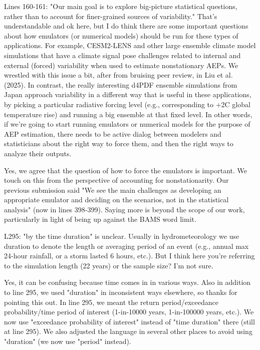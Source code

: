 \documentclass[12pt,english]{reviewresponse}
\begin{document}
\begin{revcomment}
   Lines 160-161: "Our main goal is to explore big-picture statistical questions, rather than to account for finer-grained sources of variability." That's understandable and ok here, but I do think there are some important questions about how emulators (or numerical models) should be run for these types of applications. For example, CESM2-LENS and other large ensemble climate model simulations that have a climate signal pose challenges related to internal and external (forced) variability when used to estimate nonstationary AEPs. We wrestled with this issue a bit, after from bruising peer review, in Liu et al. (2025). In contrast, the really interesting d4PDF ensemble simulations from Japan approach variability in a different way that is useful in these applications, by picking a particular radiative forcing level (e.g., corresponding to +2C global temperature rise) and running a big ensemble at that fixed level. In other words, if we're going to start running emulators or
numerical models for the purpose of AEP estimation, there needs to be active dialog between modelers and statisticians about the right way to force them, and then the right ways to analyze their outputs.
\end{revcomment}

\begin{revresponse}
Yes, we agree that the question of how to force the emulators is important. We touch on this from the perspective of accounting for nonstationarity. Our previous submission said "We see the main challenges as developing an appropriate emulator and deciding on the scenarios, not in the statistical analysis" (now in lines 398-399). Saying more is beyond the scope of our work, particularly in light of being up against the BAMS word limit.

\end{revresponse}

\begin{revcomment}
   L295: "by the time duration" is unclear. Usually in hydrometeorology we use duration to denote the length or averaging period of an event (e.g., annual max 24-hour rainfall, or a storm lasted 6 hours, etc.). But I think here you're referring to the simulation length (22 years) or the sample size? I'm not sure.
\end{revcomment}

\begin{revresponse}

Yes, it can be confusing because time comes in in various ways. Also in addition to line 295, we used "duration" in inconsistent ways elsewhere, so thanks for pointing this out. In line 295, we meant the return period/exceedance probability/time period of interest (1-in-10000 years, 1-in-100000 years, etc.). We now use "exceedance probability of interest" instead of "time duration" there (still at line 295). We also adjusted the language in several other places to avoid using "duration" (we now use "period" instead).

\end{revresponse}
\end{document}
